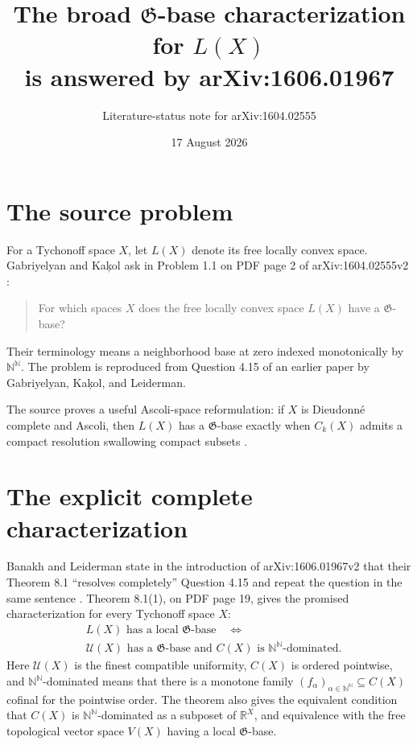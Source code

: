 \documentclass[11pt]{article}
\title{The broad $\mathfrak G$-base characterization for $L(X)$\\
is answered by arXiv:1606.01967}
\author{Literature-status note for arXiv:1604.02555}
\date{17 August 2026}
\newcommand{\NN}{\mathbb N}
\newcommand{\RR}{\mathbb R}
\begin{document}
\maketitle

\begin{center}
\end{center}

\section{The source problem}

For a Tychonoff space $X$, let $L(X)$ denote its free locally convex space.
Gabriyelyan and Ka\c{k}ol ask in Problem 1.1 on PDF page 2 of
arXiv:1604.02555v2 \cite{GK}:
\begin{quote}
For which spaces $X$ does the free locally convex space $L(X)$ have a
$\mathfrak G$-base?
\end{quote}
Their terminology means a neighborhood base at zero indexed monotonically by
$\NN^{\NN}$.  The problem is reproduced from Question 4.15 of an earlier paper
by Gabriyelyan, Ka\c{k}ol, and Leiderman.

The source proves a useful Ascoli-space reformulation: if $X$ is Dieudonn\'e
complete and Ascoli, then $L(X)$ has a $\mathfrak G$-base exactly when
$C_k(X)$ admits a compact resolution swallowing compact subsets
\cite[Theorem~1.2]{GK}.

\section{The explicit complete characterization}

Banakh and Leiderman state in the introduction of arXiv:1606.01967v2 that
their Theorem 8.1 ``resolves completely'' Question 4.15 and repeat the question
in the same sentence \cite[PDF pp.~2--3]{BL}.  Theorem 8.1(1), on PDF page 19,
gives the promised characterization for every Tychonoff space $X$:
\[
\boxed{
\begin{aligned}
&L(X)\text{ has a local }\mathfrak G\text{-base}\quad\Longleftrightarrow\\
&\mathcal U(X)\text{ has a }\mathfrak G\text{-base and }C(X)
  \text{ is }\NN^{\NN}\text{-dominated}.
\end{aligned}}
\]
Here $\mathcal U(X)$ is the finest compatible uniformity, $C(X)$ is ordered
pointwise, and $\NN^{\NN}$-dominated means that there is a monotone family
$(f_\alpha)_{\alpha\in\NN^{\NN}}\subseteq C(X)$ cofinal for the pointwise
order.  The theorem also gives the equivalent condition that $C(X)$ is
$\NN^{\NN}$-dominated as a subposet of $\RR^X$, and equivalence with the free
topological vector space $V(X)$ having a local $\mathfrak G$-base.
\end{document}

